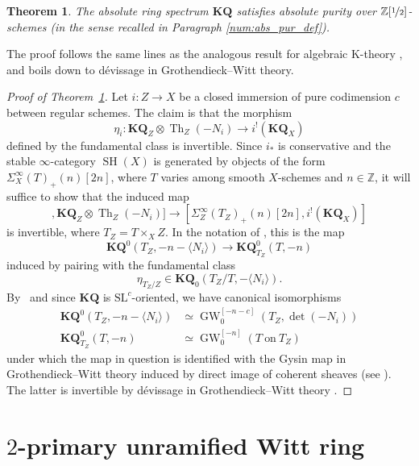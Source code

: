\documentclass[11pt]{article}
\numberwithin{equation}{section}\renewcommand{\encodingdefault}{TU}
\DeclareMathOperator{\GW}{GW}
\newcommand{\KQ}{\mathbf{KQ}}
\newcommand{\SL}{\mathrm{SL}}
\newcommand{\vb}[1]{\langle#1\rangle}
\DeclareMathOperator{\SH}{SH}
\DeclareMathOperator{\Th}{Th}
\newcommand{\ZZ} {\mathbb Z}
\newcommand{\ZZot} {\mathbb Z[\nicefrac 1 2]}
\newtheorem{thm}{Theorem}[section]
\theoremstyle{remark}
\theoremstyle{definition}
\numberwithin{equation}{thm}
\begin{document}
\begin{thm}\label{thm:abs_purity_KQ}
The absolute ring spectrum $\KQ$ satisfies absolute purity over $\ZZot$-schemes (in the sense recalled in Paragraph \ref{num:abs_pur_def}).
\end{thm}

The proof follows the same lines as the analogous result for algebraic K-theory \cite[Th.\,13.6.3]{CD3}, and boils down to dévissage in Grothendieck--Witt theory.

\begin{proof}[Proof of Theorem~\ref{thm:abs_purity_KQ}]
Let $i:Z\to X$ be a closed immersion of pure codimension $c$ between regular schemes.
The claim is that the morphism
\[
\eta_i : \KQ_Z \otimes \Th_Z(-N_i) \to i^!(\KQ_X)
\]
defined by the fundamental class is invertible.
Since $i_*$ is conservative and the stable $\infty$-category $\SH(X)$ is generated by objects of the form $\Sigma^\infty_X(T)_+(n)[2n]$, where $T$ varies among smooth $X$-schemes and $n\in\ZZ$, it will suffice to show that the induced map
\begin{equation*}
[\Sigma^\infty_Z(T_Z)_+(n)[2n],\KQ_Z\otimes\Th_Z(-N_i)]
\to [\Sigma^\infty_Z(T_Z)_+(n)[2n],i^!(\KQ_X)]
\end{equation*}
is invertible, where $T_Z = T\times_X Z$.
In the notation of \cite{DJK}, this is the map
\begin{equation*}
\KQ^0(T_Z, -n-\vb{N_i}) \to \KQ^0_{T_Z}(T, -n)
\end{equation*}
induced by pairing with the fundamental class
\[
\eta_{T_Z/Z} \in \KQ_0(T_Z/T, -\vb{N_i}).
\]
By~\cite[Cor.\,7.3]{PaninWalter1} and since $\KQ$ is $\SL^c$-oriented, we have canonical isomorphisms
\begin{align*}
\KQ^0(T_Z, -n-\vb{N_i}) &\simeq \GW_{0}^{[-n-c]}(T_Z, \det(-N_i))\\
\KQ^0_{T_Z}(T, -n) &\simeq \GW_{0}^{[-n]}(T~\text{on}~T_Z)
\end{align*}
under which the map in question is identified with the Gysin map in Grothendieck--Witt theory induced by direct image of coherent sheaves (see \cite[(9.9)]{Schlicht2}).
The latter is invertible by dévissage in Grothendieck--Witt theory \cite[Th.\,9.5, 9.18 \& 9.19]{Schlicht2}.
\end{proof}

\section{\texorpdfstring{$2$}{2}-primary unramified Witt ring}
\label{apd:W}
\end{document}
